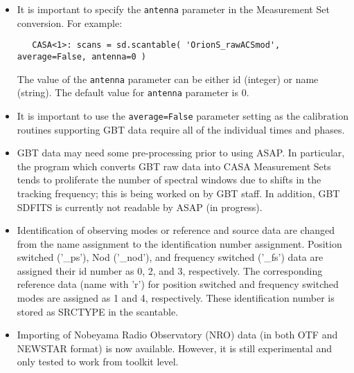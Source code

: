 \begin{itemize}

\item It is important to specify the {\tt antenna} parameter in the Measurement Set conversion.
 For example:

\begin{verbatim}
   CASA<1>: scans = sd.scantable( 'OrionS_rawACSmod', average=False, antenna=0 )
\end{verbatim}
 
 The value of the {\tt antenna} parameter can be either id (integer) or name
 (string). The default value for {\tt antenna} parameter is 0.

\item It is important to use the {\tt average=False} parameter
setting as the calibration routines supporting GBT data require all of
the individual times and phases.

\item GBT data may need some pre-processing prior to using
ASAP. In particular, the program which converts GBT raw data into CASA
Measurement Sets tends to proliferate the number of spectral windows
due to shifts in the tracking frequency; this is being worked on by
GBT staff. In addition, GBT SDFITS is currently not readable by ASAP
(in progress).

%
\item  Identification of observing modes or reference and source data are
 changed from the name assignment to the identification number
 assignment. Position switched ('\_ps'), Nod ('\_nod'), and  frequency
 switched ('\_fs') data are assigned their id number as 0, 2, and 3,
 respectively. The corresponding reference data (name with 'r') for position
 switched and frequency switched modes are assigned as 1 and 4,
 respectively. These identification number is stored as SRCTYPE in
 the scantable.

\item  Importing of Nobeyama Radio Observatory (NRO) data (in both OTF and NEWSTAR format)
 is now available. However, it is still experimental and only tested to work from toolkit level.
\end{itemize}

